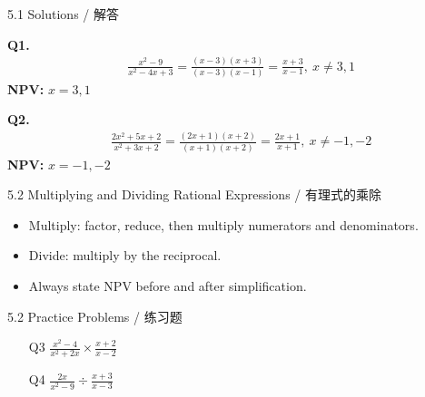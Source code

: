 \documentclass[aspectratio=169]{beamer}
\begin{document}
\begin{frame}{5.1 Solutions / 解答}
    \begin{tcolorbox}[colback=lightgray,colframe=primary,title=Solutions]
        \footnotesize
        \textbf{Q1.}
        \begin{align*}
            &\frac{x^2-9}{x^2-4x+3} = \frac{(x-3)(x+3)}{(x-3)(x-1)} = \frac{x+3}{x-1},\ x\neq3,1
        \end{align*}
        \textbf{NPV:} $x=3,1$
        
        \textbf{Q2.}
        \begin{align*}
            &\frac{2x^2+5x+2}{x^2+3x+2} = \frac{(2x+1)(x+2)}{(x+1)(x+2)} = \frac{2x+1}{x+1},\ x\neq-1,-2
        \end{align*}
        \textbf{NPV:} $x=-1,-2$
    \end{tcolorbox}
\end{frame}

\begin{frame}{5.2 Multiplying and Dividing Rational Expressions / 有理式的乘除}
    \begin{tcolorbox}[colback=lightgray,colframe=primary,title=Key Points / 重点]
        \footnotesize
        \begin{itemize}
            \item Multiply: factor, reduce, then multiply numerators and denominators.
            \item Divide: multiply by the reciprocal.
            \item Always state NPV before and after simplification.
        \end{itemize}
    \end{tcolorbox}
\end{frame}

\begin{frame}{5.2 Practice Problems / 练习题}
    \begin{tcolorbox}[colback=lightgray,colframe=accent,title=Practice]
        \footnotesize
        \begin{enumerate}
            \item[Q3] $\frac{x^2-4}{x^2+2x} \times \frac{x+2}{x-2}$
            \item[Q4] $\frac{2x}{x^2-9} \div \frac{x+3}{x-3}$
        \end{enumerate}
    \end{tcolorbox}
\end{frame}
\end{document}
